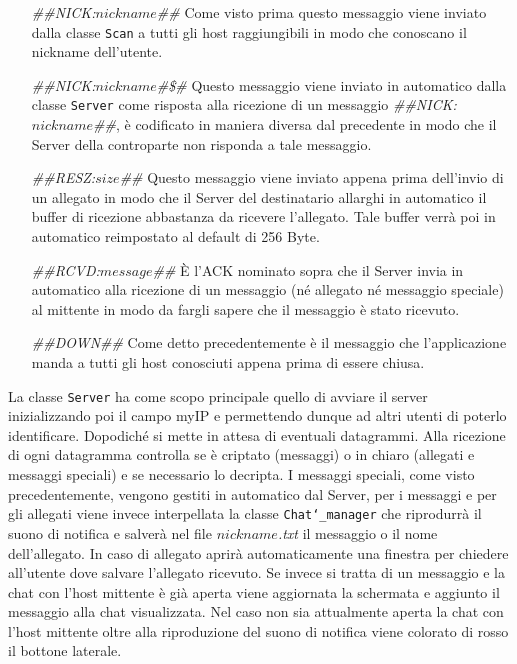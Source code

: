 \begin{itemize}
	\item[\emph{\#\#NICK:$nickname$\#\#}] Come visto prima questo messaggio viene inviato dalla classe \texttt{Scan}
	a tutti gli host raggiungibili in modo che conoscano il nickname dell'utente.
	\item[\emph{\#\#NICK:$nickname$\#\$\#}] Questo messaggio viene inviato in automatico dalla classe \texttt{Server}
	come risposta alla ricezione di un messaggio \emph{\#\#NICK:$nickname$\#\#}, è codificato in maniera diversa dal
	precedente in modo che il Server della controparte non risponda a tale messaggio.
	\item[\emph{\#\#RESZ:$size$\#\#}] Questo messaggio viene inviato appena prima dell'invio di un allegato in modo che
	il Server del destinatario allarghi in automatico il buffer di ricezione abbastanza da ricevere l'allegato.
	Tale buffer verrà poi in automatico reimpostato al default di 256 Byte.
	\item[\emph{\#\#RCVD:$message$\#\#}] È l'ACK nominato sopra che il Server invia in automatico alla ricezione di un
	messaggio (né allegato né messaggio speciale) al mittente in modo da fargli sapere che il messaggio è stato
	ricevuto.
	\item[\emph{\#\#DOWN\#\#}] Come detto precedentemente è il messaggio che l'applicazione manda a tutti gli host
	conosciuti appena prima di essere chiusa.
\end{itemize}

La classe \texttt{Server} ha come scopo principale quello di avviare il server
inizializzando poi il campo myIP e permettendo dunque ad altri utenti di poterlo identificare.
Dopodiché si mette in attesa di eventuali datagrammi. Alla ricezione di ogni datagramma controlla se
è criptato (messaggi) o in chiaro (allegati e messaggi speciali) e se necessario lo decripta. 
I messaggi speciali, come visto precedentemente, vengono gestiti in automatico dal Server, per i
messaggi e per gli allegati viene invece interpellata la classe \texttt{Chat\char`_manager} che riprodurrà
il suono di notifica e salverà nel file \emph{$nickname$.txt} il messaggio o il nome dell'allegato. In caso di 
allegato aprirà automaticamente una finestra per chiedere all'utente dove salvare l'allegato ricevuto.
Se invece si tratta di un messaggio e la chat con l'host mittente è già aperta viene aggiornata la schermata e 
aggiunto il messaggio alla chat visualizzata. Nel caso non sia attualmente aperta la chat con l'host
mittente oltre alla riproduzione del suono di notifica viene colorato di rosso il bottone laterale.